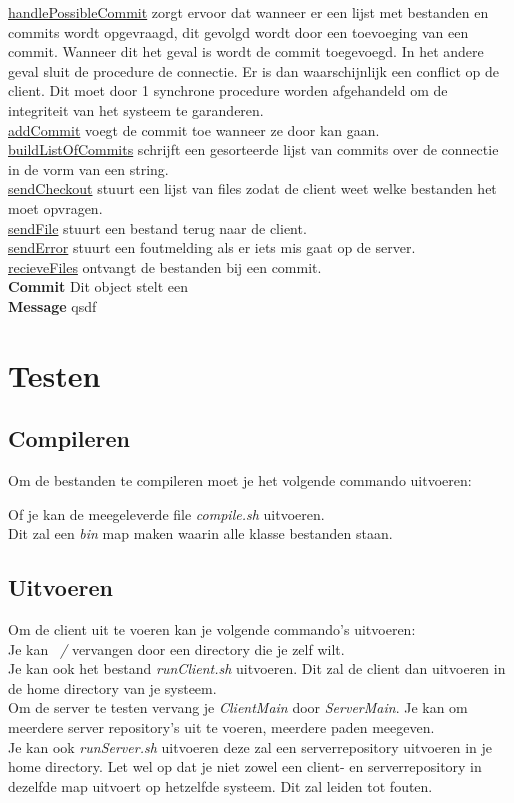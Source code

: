 \documentclass{article}
\begin{document}
\underline{handlePossibleCommit} zorgt ervoor dat wanneer er een lijst met bestanden en commits wordt opgevraagd, dit gevolgd wordt door een toevoeging van een commit. Wanneer dit het geval is wordt de commit toegevoegd. In het andere geval sluit de procedure de connectie. Er is dan waarschijnlijk een conflict op de client. Dit moet door 1 synchrone procedure worden afgehandeld om de integriteit van het systeem te garanderen.\\
\underline{addCommit} voegt de commit toe wanneer ze door kan gaan.\\
\underline{buildListOfCommits} schrijft een gesorteerde lijst van commits over de connectie in de vorm van een string.\\
\underline{sendCheckout} stuurt een lijst van files zodat de client weet welke bestanden het moet opvragen.\\
\underline{sendFile} stuurt een bestand terug naar de client.\\
\underline{sendError} stuurt een foutmelding als er iets mis gaat op de server.\\
\underline{recieveFiles} ontvangt de bestanden bij een commit.\\

\textbf{Commit}\label{commit} Dit object stelt een \\

\textbf{Message}\label{message} qsdf\\



\section{Testen}\label{test}
\subsection{Compileren}
Om de bestanden te compileren moet je het volgende commando uitvoeren:

Of je kan de meegeleverde file \emph{compile.sh} uitvoeren.\\ Dit zal een \emph{bin} map maken waarin alle klasse bestanden staan. 
\subsection{Uitvoeren}
Om de client uit te voeren kan je volgende commando's uitvoeren:\\

Je kan \emph{~/} vervangen door een directory die je zelf wilt.\\
Je kan ook het bestand \emph{runClient.sh} uitvoeren. Dit zal de client dan uitvoeren in de home directory van je systeem.\\
Om de server te testen vervang je \emph{ClientMain} door \emph{ServerMain}. Je kan om meerdere server repository's uit te voeren, meerdere paden meegeven.\\Je kan ook \emph{runServer.sh} uitvoeren deze zal een serverrepository uitvoeren in je home directory. Let wel op dat je niet zowel een client- en serverrepository in dezelfde map uitvoert op hetzelfde systeem. Dit zal leiden tot fouten.
\end{document}
